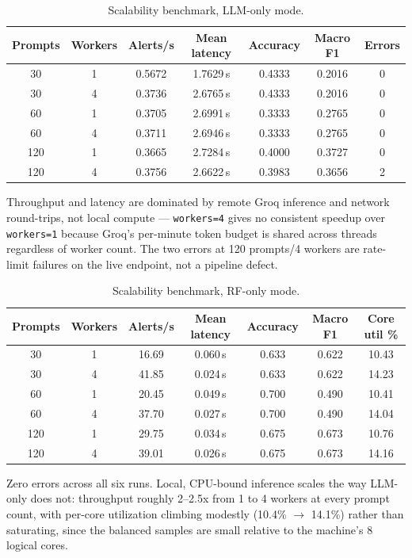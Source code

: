 \documentclass[twocolumn]{svjour3}
\begin{document}
\begin{table}[h]
\caption{Scalability benchmark, LLM-only mode.}\label{tab5}
\begin{tabular}{@{}ccccccc@{}}
\toprule
Prompts & Workers & Alerts/s & Mean latency & Accuracy & Macro F1 & Errors \\
\midrule
30  & 1 & 0.5672 & 1.7629\,s & 0.4333 & 0.2016 & 0 \\
30  & 4 & 0.3736 & 2.6765\,s & 0.4333 & 0.2016 & 0 \\
60  & 1 & 0.3705 & 2.6991\,s & 0.3333 & 0.2765 & 0 \\
60  & 4 & 0.3711 & 2.6946\,s & 0.3333 & 0.2765 & 0 \\
120 & 1 & 0.3665 & 2.7284\,s & 0.4000 & 0.3727 & 0 \\
120 & 4 & 0.3756 & 2.6622\,s & 0.3983 & 0.3656 & 2 \\
\bottomrule
\end{tabular}
\end{table}

Throughput and latency are dominated by remote Groq inference and network round-trips, not local compute --- \texttt{workers=4} gives no consistent speedup over \texttt{workers=1} because Groq's per-minute token budget is shared across threads regardless of worker count. The two errors at 120 prompts/4 workers are rate-limit failures on the live endpoint, not a pipeline defect.

\begin{table}[h]
\caption{Scalability benchmark, RF-only mode.}\label{tab6}
\begin{tabular}{@{}ccccccc@{}}
\toprule
Prompts & Workers & Alerts/s & Mean latency & Accuracy & Macro F1 & Core util \% \\
\midrule
30  & 1 & 16.69 & 0.060\,s & 0.633 & 0.622 & 10.43 \\
30  & 4 & 41.85 & 0.024\,s & 0.633 & 0.622 & 14.23 \\
60  & 1 & 20.45 & 0.049\,s & 0.700 & 0.490 & 10.41 \\
60  & 4 & 37.70 & 0.027\,s & 0.700 & 0.490 & 14.04 \\
120 & 1 & 29.75 & 0.034\,s & 0.675 & 0.673 & 10.76 \\
120 & 4 & 39.01 & 0.026\,s & 0.675 & 0.673 & 14.16 \\
\bottomrule
\end{tabular}
\end{table}

Zero errors across all six runs. Local, CPU-bound inference scales the way LLM-only does not: throughput roughly 2--2.5x from 1 to 4 workers at every prompt count, with per-core utilization climbing modestly (10.4\% $\to$ 14.1\%) rather than saturating, since the balanced samples are small relative to the machine's 8 logical cores.
\end{document}
